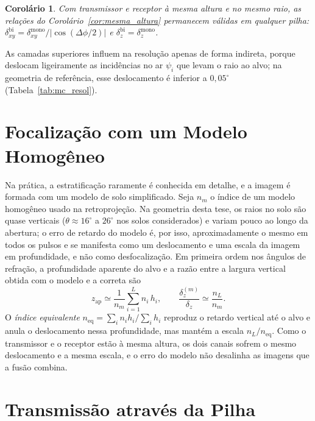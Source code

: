 \documentclass[12pt,a4paper,oneside]{book}
\theoremstyle{remark}
\theoremstyle{plain}
\newtheorem{corolario}{Corolário}[chapter]
\theoremstyle{definition}
\begin{document}
\begin{corolario}
\label{cor:multi_mono_bi}
Com transmissor e receptor à mesma altura e no mesmo raio, as relações do
Corolário~\ref{cor:mesma_altura} permanecem válidas em qualquer pilha:
$\delta_{xy}^{\text{bi}}=\delta_{xy}^{\text{mono}}/|\cos(\Delta\phi/2)|$ e
$\delta_z^{\text{bi}}=\delta_z^{\text{mono}}$.
\end{corolario}

As camadas superiores influem na resolução apenas de forma indireta, porque
deslocam ligeiramente as incidências no ar $\psi_i$ que levam o raio ao alvo; na
geometria de referência, esse deslocamento é inferior a $0,05^\circ$
(Tabela~\ref{tab:mc_resol}).

\section{Focalização com um Modelo Homogêneo}
\label{sec:multi_foco}

Na prática, a estratificação raramente é conhecida em detalhe, e a imagem é
formada com um modelo de solo simplificado. Seja $n_m$ o índice de um modelo
homogêneo usado na retroprojeção. Na geometria desta tese, os raios no solo são
quase verticais ($\theta\approx16^\circ$ a $26^\circ$ nos solos considerados) e variam pouco ao longo da
abertura; o erro de retardo do modelo é, por isso, aproximadamente o mesmo em
todos os pulsos e se manifesta como um deslocamento e uma escala da imagem em
profundidade, e não como desfocalização. Em primeira ordem nos ângulos de
refração, a profundidade aparente do alvo e a razão entre a largura vertical
obtida com o modelo e a correta são
\begin{equation}
  z_{\text{ap}}\simeq\frac{1}{n_m}\sum_{i=1}^{L}n_i\,h_i ,
  \qquad
  \frac{\delta_z^{(m)}}{\delta_z}\simeq\frac{n_L}{n_m} .
  \label{eq:modelo_homog}
\end{equation}
O \emph{índice equivalente} $n_{\text{eq}}=\sum_i n_ih_i/\sum_ih_i$ reproduz o
retardo vertical até o alvo e anula o deslocamento nessa profundidade, mas
mantém a escala $n_L/n_{\text{eq}}$. Como o transmissor e o receptor estão à
mesma altura, os dois canais sofrem o mesmo deslocamento e a mesma escala, e o
erro do modelo não desalinha as imagens que a fusão combina.

\section{Transmissão através da Pilha}
\label{sec:abcd}
\end{document}
